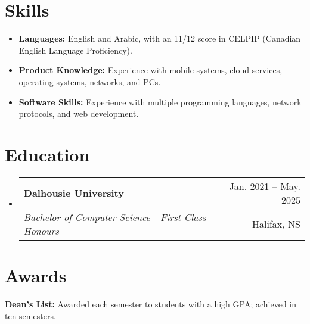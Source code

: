 \documentclass[letterpaper,11pt]{article}
\makeatletter
\newcommand{\resumeItem}[1]{
  \item\small{
    {#1 \vspace{-2pt}}
  }
}
\newcommand{\resumeSubheading}[4]{
  \vspace{-2pt}\item
    \begin{tabular*}{0.97\textwidth}[t]{l@{\extracolsep{\fill}}r}
      \textbf{#1} & #2 \\
			\textit{\small#3} & \small #4 \\
    \end{tabular*}\vspace{-7pt}
}
\newcommand{\resumeSubHeadingListStart}{\begin{itemize}[leftmargin=0.15in, label={}]}
\newcommand{\resumeSubHeadingListEnd}{\end{itemize}}
\newcommand{\resumeItemListStart}{\begin{itemize}}
\newcommand{\resumeItemListEnd}{\end{itemize}\vspace{-5pt}}
\makeatother
\begin{document}

\vspace{5pt}
\section{Skills}
  \resumeItemListStart
		\resumeItem{\textbf{Languages:} English and Arabic, with an 11/12 score in CELPIP (Canadian English Language Proficiency).}
		\resumeItem{\textbf{Product Knowledge: }{Experience with mobile systems, cloud services, operating systems, networks, and PCs.}} \\
		\resumeItem{\textbf{Software Skills: } Experience with multiple programming languages, network protocols, and web development.}
	\resumeItemListEnd 



\vspace{5pt}
\section{Education}
  \resumeSubHeadingListStart
    \resumeSubheading
      {Dalhousie University}{Jan. 2021 -- May. 2025}
      {Bachelor of Computer Science - First Class Honours}
      {Halifax, NS}
    
  \resumeSubHeadingListEnd


\section{Awards}
 \begin{itemize}[leftmargin=0.15in, label={}]
    \small{\item{
   
     \textbf{Dean's List:}{ Awarded each semester to students with a high GPA; achieved in ten semesters.}
    
    }}
 \end{itemize}


\end{document}
